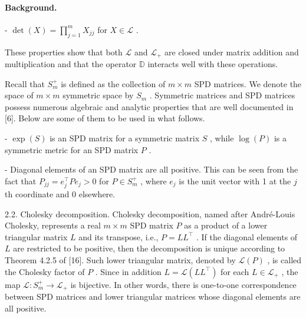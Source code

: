 \documentclass[11pt]{article}
\begin{document}
\paragraph{Background.}
-  $\operatorname{det}(X) = \prod_{j=1}^{m} X_{jj}$  for  $X \in \mathcal{L}$ .

These properties show that both  $\mathcal{L}$  and  $\mathcal{L}_{+}$  are closed under matrix addition and multiplication and that the operator  $\mathbb{D}$  interacts well with these operations.

Recall that  $S_{m}^{+}$  is defined as the collection of  $m \times m$  SPD matrices. We denote the space of  $m \times m$  symmetric space by  $S_{m}$ . Symmetric matrices and SPD matrices possess numerous algebraic and analytic properties that are well documented in [6]. Below are some of them to be used in what follows.

-  $\exp(S)$  is an SPD matrix for a symmetric matrix  $S$ , while  $\log(P)$  is a symmetric metric for an SPD matrix  $P$ .

- Diagonal elements of an SPD matrix are all positive. This can be seen from the fact that  $P_{jj} = e_j^\top Pe_j > 0$  for  $P \in S_m^+$ , where  $e_j$  is the unit vector with 1 at the  $j$ th coordinate and 0 elsewhere.

2.2. Cholesky decomposition. Cholesky decomposition, named after André-Louis Cholesky, represents a real  $m \times m$  SPD matrix  $P$  as a product of a lower triangular matrix  $L$  and its transpose, i.e.,  $P = LL^{\top}$ . If the diagonal elements of  $L$  are restricted to be positive, then the decomposition is unique according to Theorem 4.2.5 of [16]. Such lower triangular matrix, denoted by  $\mathcal{L}(P)$ , is called the Cholesky factor of  $P$ . Since in addition  $L = \mathcal{L}(LL^{\top})$  for each  $L \in \mathcal{L}_{+}$ , the map  $\mathcal{L}: S_{m}^{+} \to \mathcal{L}_{+}$  is bijective. In other words, there is one-to-one correspondence between SPD matrices and lower triangular matrices whose diagonal elements are all positive.
\end{document}
